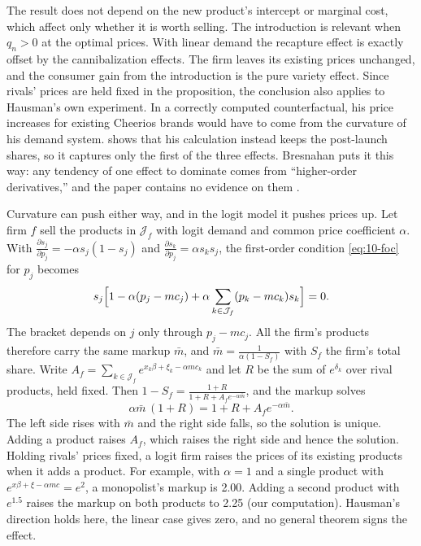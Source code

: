 The result does not depend on the new product's intercept or marginal cost, which affect only whether it is
worth selling. The introduction is relevant when $q_n > 0$ at the optimal prices. With linear demand the
recapture effect is exactly offset by the cannibalization effects. The firm leaves its existing prices
unchanged, and the consumer gain from the introduction is the pure variety effect. Since rivals' prices are
held fixed in the proposition, the conclusion also applies to Hausman's own experiment. In a correctly computed
counterfactual, his price increases for existing Cheerios brands would have to come from the curvature of his
demand system.  shows that his calculation instead keeps the post-launch shares,
so it captures only the first of the three effects. Bresnahan
puts it this way: any tendency of one effect to dominate comes from ``higher-order derivatives,'' and the
paper contains no evidence on them \citep[p.~245]{Bresnahan1997}.

\begin{remark}\label{rem:10-logit-multiproduct}
Curvature can push either way, and in the logit model it pushes prices up. Let firm $f$ sell the products in
$\mathcal{J}_f$ with logit demand and common price coefficient $\alpha$. With
$\frac{\partial s_j}{\partial p_j} = -\alpha s_j(1 - s_j)$ and $\frac{\partial s_k}{\partial p_j} = \alpha
s_ks_j$, the first-order condition \eqref{eq:10-foc} for $p_j$ becomes
\begin{equation*}
  s_j\Bigl[1 - \alpha(p_j - mc_j) + \alpha\sum_{k\in\mathcal{J}_f}(p_k - mc_k)s_k\Bigr] = 0 .
\end{equation*}
The bracket depends on $j$ only through $p_j - mc_j$. All the firm's products therefore carry the same markup
$\bar m$, and $\bar m = \frac{1}{\alpha(1 - S_f)}$ with $S_f$ the firm's total share. Write
$A_f = \sum_{k\in\mathcal{J}_f}e^{x_k\beta + \xi_k - \alpha mc_k}$ and let $R$ be the sum of $e^{\delta_k}$
over rival products, held fixed. Then
$1 - S_f = \frac{1 + R}{1 + R + A_fe^{-\alpha\bar m}}$, and the markup solves
\begin{equation*}
  \alpha\bar m\,(1 + R) = 1 + R + A_fe^{-\alpha\bar m}.
\end{equation*}
The left side rises with $\bar m$ and the right side falls, so the solution is unique. Adding a product raises
$A_f$, which raises the right side and hence the solution. Holding rivals' prices fixed, a logit firm raises the
prices of its existing products when it adds a product. For example, with $\alpha = 1$ and a single product
with $e^{x\beta + \xi - \alpha mc} = e^2$, a monopolist's markup is 2.00. Adding a second product with
$e^{1.5}$ raises the markup on both products to 2.25 (our computation).
Hausman's direction holds here, the linear case gives zero, and no general theorem signs the effect.
\end{remark}

